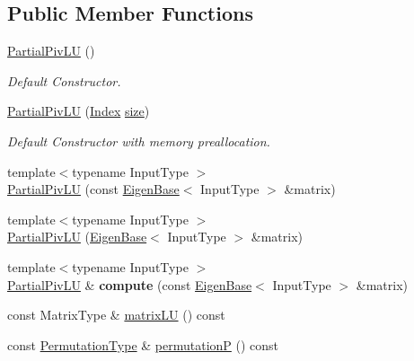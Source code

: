 \subsection*{Public Member Functions}
\begin{DoxyCompactItemize}
\item 
\mbox{\hyperlink{class_eigen_1_1_partial_piv_l_u_a5c04818d354f94a98786d8a44cb709c6}{Partial\+Piv\+LU}} ()
\begin{DoxyCompactList}\small\item\em Default Constructor. \end{DoxyCompactList}\item 
\mbox{\hyperlink{class_eigen_1_1_partial_piv_l_u_acf892c12d8a229b32bddc3149e32e63a}{Partial\+Piv\+LU}} (\mbox{\hyperlink{struct_eigen_1_1_eigen_base_a554f30542cc2316add4b1ea0a492ff02}{Index}} \mbox{\hyperlink{struct_eigen_1_1_eigen_base_ac2c9348df3bb9c0044dbae6c278a8977}{size}})
\begin{DoxyCompactList}\small\item\em Default Constructor with memory preallocation. \end{DoxyCompactList}\item 
{\footnotesize template$<$typename Input\+Type $>$ }\\\mbox{\hyperlink{class_eigen_1_1_partial_piv_l_u_acf37214aebb54d0e186ae39ac6c41bdf}{Partial\+Piv\+LU}} (const \mbox{\hyperlink{struct_eigen_1_1_eigen_base}{Eigen\+Base}}$<$ Input\+Type $>$ \&matrix)
\item 
{\footnotesize template$<$typename Input\+Type $>$ }\\\mbox{\hyperlink{class_eigen_1_1_partial_piv_l_u_a4efc917d31d0e9d76781a97509309061}{Partial\+Piv\+LU}} (\mbox{\hyperlink{struct_eigen_1_1_eigen_base}{Eigen\+Base}}$<$ Input\+Type $>$ \&matrix)
\item 
\mbox{\label{class_eigen_1_1_partial_piv_l_u_a6236eb61ae6886543c407582f4ca1550}} 
{\footnotesize template$<$typename Input\+Type $>$ }\\\mbox{\hyperlink{class_eigen_1_1_partial_piv_l_u}{Partial\+Piv\+LU}} \& {\bfseries compute} (const \mbox{\hyperlink{struct_eigen_1_1_eigen_base}{Eigen\+Base}}$<$ Input\+Type $>$ \&matrix)
\item 
const Matrix\+Type \& \mbox{\hyperlink{class_eigen_1_1_partial_piv_l_u_abea0d7e51c5591a6db152eade0892d9c}{matrix\+LU}} () const
\item 
const \mbox{\hyperlink{class_eigen_1_1_permutation_matrix}{Permutation\+Type}} \& \mbox{\hyperlink{class_eigen_1_1_partial_piv_l_u_a1c637530b3215787668a75ebb2e7b882}{permutationP}} () const

\end{DoxyCompactItemize}
